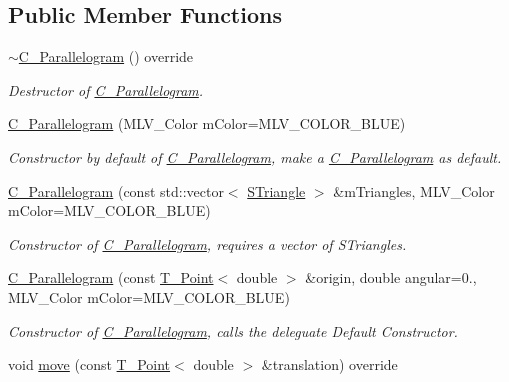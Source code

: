 \subsection*{Public Member Functions}
\begin{DoxyCompactItemize}
\item 
\mbox{\label{classParallelogram_ae3c14e58b92406f4679234817313a26c}} 
\hyperlink{classParallelogram_ae3c14e58b92406f4679234817313a26c}{$\sim$\+C_Parallelogram} () override
\begin{DoxyCompactList}\small\item\em Destructor of \hyperlink{classParallelogram}{C_Parallelogram}. \end{DoxyCompactList}\item
\hyperlink{classParallelogram_a2200aa50be9b13ccb40a371a3d2b119b}{C_Parallelogram} (M\+L\+V\+\_\+\+Color mColor=M\+L\+V\+\_\+\+C\+O\+L\+O\+R\+\_\+\+B\+L\+UE)
\begin{DoxyCompactList}\small\item\em Constructor by default of \hyperlink{classParallelogram}{C_Parallelogram}, make a \hyperlink{classParallelogram}{C_Parallelogram} as default. \end{DoxyCompactList}\item
\hyperlink{classParallelogram_ac60d6fc9e306b202e9c679d170d6d063}{C_Parallelogram} (const std\+::vector$<$ \hyperlink{classSTriangle}{S\+Triangle} $>$ \&mTriangles, M\+L\+V\+\_\+\+Color mColor=M\+L\+V\+\_\+\+C\+O\+L\+O\+R\+\_\+\+B\+L\+UE)
\begin{DoxyCompactList}\small\item\em Constructor of \hyperlink{classParallelogram}{C_Parallelogram}, requires a vector of S\+Triangles. \end{DoxyCompactList}\item
\hyperlink{classParallelogram_aeed0c83e942a4869b79d4baab00c2874}{C_Parallelogram} (const \hyperlink{classPoint}{T_Point}$<$ double $>$ \&origin, double angular=0., M\+L\+V\+\_\+\+Color mColor=M\+L\+V\+\_\+\+C\+O\+L\+O\+R\+\_\+\+B\+L\+UE)
\begin{DoxyCompactList}\small\item\em Constructor of \hyperlink{classParallelogram}{C_Parallelogram}, calls the deleguate Default Constructor. \end{DoxyCompactList}\item
void \hyperlink{classParallelogram_ae8d51f9b629160df31c8a12c28da279e}{move} (const \hyperlink{classPoint}{T_Point}$<$ double $>$ \&translation) override

\end{DoxyCompactItemize}
